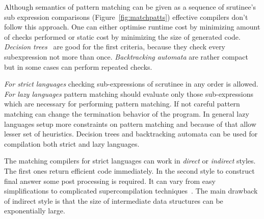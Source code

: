 \begin{comment}
\begin{figure}[ht]
\begin{minipage}[b]{0.3\linewidth}
\centering
\label{fig:figure1}
\end{minipage}
\hspace{0.5cm}
\begin{minipage}[b]{0.3\linewidth}
\centering
\begin{lstlisting}
switch x with 
| true -> 
    switch y with 
    | true -> 
       switch z with 
       | true -> 4
       | _ -> 3
    | _ -> 
      switch z with 
      | true -> 1
      | _ -> 3 
| _ -> 
   switch y with 
   | true -> 2 
   | _ -> if z then 1 else 3
\end{lstlisting}
\end{minipage}
\hspace{0.5cm}
\begin{minipage}[b]{0.3\linewidth}
\centering
\end{minipage}
\end{figure}
\end{comment}



Although semantics of pattern matching can be given as a sequence of srutinee's sub expression comparisons (Figure~\ref{fig:matchpatts}) effective compilers don't follow
this approach. One can either optimise runtime cost by minimizing amount of checks performed or static cost by minimizing the size of generated code. \emph{Decision trees}~\cite{?}
are good for the first criteria, because they check every subexpression not more than once. \emph{Backtracking automata} are rather compact but in some cases can perform
repeated checks.

\emph{For strict languages} checking sub-expressions of scrutinee in any order is allowed. \emph{For lazy languages} pattern matching should evaluate only those sub-expressions which are
necessary for performing pattern matching. If not careful pattern matching can change the termination behavior of the program. In general lazy languages setup more constraints on pattern matching and because of that allow lesser set of heuristics. Decision trees and backtracking automata can be used for compilation both  strict and lazy languages.

The matching compilers for strict languages can work in \emph{direct} or \emph{indirect} styles. The first ones return efficient code immediately. In the second style to
construct final answer some post processing is required. It can vary from easy simplifications to complicated supercompilation techniques~\cite{sestoft1996}. The main
drawback of indirect style is that the size of intermediate data structures can be exponentially large.

